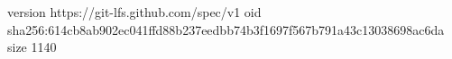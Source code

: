 version https://git-lfs.github.com/spec/v1
oid sha256:614cb8ab902ec041ffd88b237eedbb74b3f1697f567b791a43c13038698ac6da
size 1140
